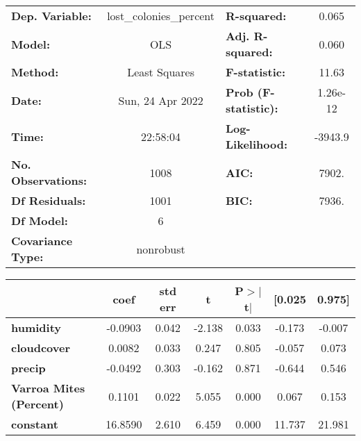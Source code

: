 \begin{center}
\begin{tabular}{lclc}
\toprule
\textbf{Dep. Variable:}    & lost\_colonies\_percent & \textbf{  R-squared:         } &    0.065  \\
\textbf{Model:}            &           OLS           & \textbf{  Adj. R-squared:    } &    0.060  \\
\textbf{Method:}           &      Least Squares      & \textbf{  F-statistic:       } &    11.63  \\
\textbf{Date:}             &     Sun, 24 Apr 2022    & \textbf{  Prob (F-statistic):} & 1.26e-12  \\
\textbf{Time:}             &         22:58:04        & \textbf{  Log-Likelihood:    } &  -3943.9  \\
\textbf{No. Observations:} &            1008         & \textbf{  AIC:               } &    7902.  \\
\textbf{Df Residuals:}     &            1001         & \textbf{  BIC:               } &    7936.  \\
\textbf{Df Model:}         &               6         & \textbf{                     } &           \\
\textbf{Covariance Type:}  &        nonrobust        & \textbf{                     } &           \\
\bottomrule
\end{tabular}
\end{center}\begin{center}
\begin{tabular}{lcccccc}
\toprule
                                & \textbf{coef} & \textbf{std err} & \textbf{t} & \textbf{P$> |$t$|$} & \textbf{[0.025} & \textbf{0.975]}  \\
\midrule
\textbf{humidity}               &      -0.0903  &        0.042     &    -2.138  &         0.033        &       -0.173    &       -0.007     \\
\textbf{cloudcover}             &       0.0082  &        0.033     &     0.247  &         0.805        &       -0.057    &        0.073     \\
\textbf{precip}                 &      -0.0492  &        0.303     &    -0.162  &         0.871        &       -0.644    &        0.546     \\
\textbf{Varroa Mites (Percent)} &       0.1101  &        0.022     &     5.055  &         0.000        &        0.067    &        0.153     \\
\textbf{constant}               &      16.8590  &        2.610     &     6.459  &         0.000        &       11.737    &       21.981     \\

\end{tabular}
\end{center}
